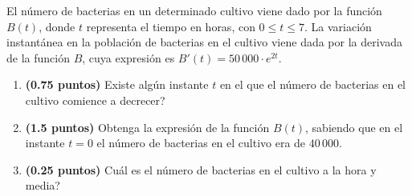 
El número de bacterias en un determinado cultivo viene dado por la
función $B(t)$, donde $t$ representa el tiempo en horas, con $0\leq t\leq 7$.
La variación instantánea en la población de bacterias en el cultivo viene
dada por la derivada de la función $B$, cuya expresión es $B'(t)=50\,000\cdot e^{2t}$.
\begin{enumerate}[label=\alph*)]
  \item \textbf{(0.75 puntos)} \textquestiondown{}Existe algún instante $t$
  en el que el número de bacterias en el cultivo comience a decrecer?
  \item \textbf{(1.5 puntos)} Obtenga la expresión de la función $B(t)$,
  sabiendo que en el instante $t=0$ el número de bacterias en el cultivo
  era de $40\,000$.
  \item \textbf{(0.25 puntos)} \textquestiondown{}Cuál es el número de
  bacterias en el cultivo a la hora y media?
\end{enumerate}

